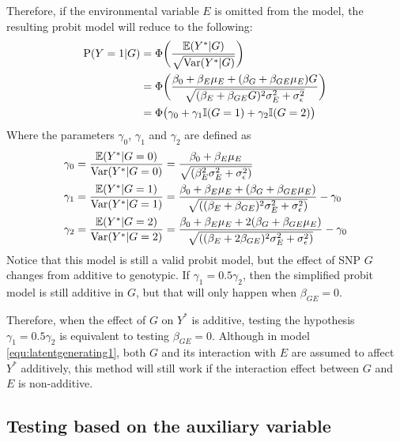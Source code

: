 Therefore, if the environmental variable $E$ is omitted from the model, the resulting probit model will reduce to the following:
\begin{equation}\label{equ:simModelAdditive}
\begin{aligned}
\text{P}(Y=1|G) &= \Phi\bigg(\frac{\mathbb{E}(Y^*|G)}{\sqrt{\text{Var}(Y^*|G)}}\bigg)\\
                  &= \Phi\bigg(\frac{\beta_0+ \beta_E \mu_E + (\beta_G +\beta_{GE}\mu_E)G}{\sqrt{(\beta_E + \beta_{GE}G)^2 \sigma_E^2 + \sigma_\epsilon^2}}\bigg)\\
                  &= \Phi\big(\gamma_0 + \gamma_1 \mathbb{I}(G=1) + \gamma_2 \mathbb{I}(G=2) \big)
\end{aligned}
\end{equation}
Where the parameters $\gamma_0$, $\gamma_1$ and $\gamma_2$ are defined as
\begin{equation}\label{equ:gammDEF1}
\begin{aligned}
\gamma_0 &= \frac{\mathbb{E}(Y^*|G=0)}{\text{Var}(Y^*|G=0)} = \frac{\beta_0 + \beta_E \mu_E}{\sqrt{(\beta_E^2 \sigma_E^2 + \sigma_\epsilon^2)}} \\
\gamma_1 &= \frac{\mathbb{E}(Y^*|G=1)}{\text{Var}(Y^*|G=1)} = \frac{\beta_0 + \beta_E \mu_E + (\beta_G+\beta_{GE}\mu_E)}{\sqrt{((\beta_E + \beta_{GE})^2 \sigma_E^2 + \sigma_\epsilon^2)}} - \gamma_0 \\
\gamma_2 &= \frac{\mathbb{E}(Y^*|G=2)}{\text{Var}(Y^*|G=2)} = \frac{\beta_0 + \beta_E \mu_E + 2(\beta_G+\beta_{GE}\mu_E)}{\sqrt{((\beta_E + 2\beta_{GE})^2 \sigma_E^2 + \sigma_\epsilon^2)}} - \gamma_0 \\
\end{aligned}
\end{equation}
Notice that this model is still a valid probit model, but the effect of SNP $G$ changes from additive to genotypic. If $\gamma_1 = 0.5 \gamma_2$, then the simplified probit model is still additive in $G$, but that will only happen when $\beta_{GE} = 0$.

Therefore, when the effect of $G$ on $Y^*$ is additive, testing the hypothesis $\gamma_1 = 0.5 \gamma_2$ is equivalent to testing $\beta_{GE} = 0$. Although in model \ref{equ:latentgenerating1}, both $G$ and its interaction with $E$ are assumed to affect $Y^*$ additively, this method will still work if the interaction effect between $G$ and $E$ is non-additive.

\subsection{Testing based on the auxiliary variable}

